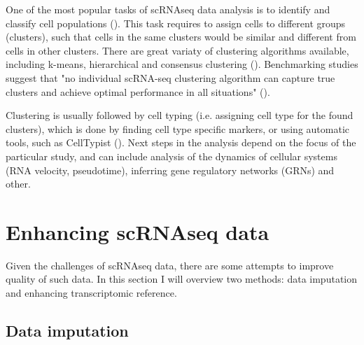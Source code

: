 One of the most popular tasks of scRNAseq data analysis is to identify and classify cell populations (\cite{Andrews2018}).
This task requires to assign cells to different groups (clusters),
such that cells in the same clusters would be similar and different from cells in other clusters.
There are great variaty of clustering algorithms available,
including k-means, hierarchical and consensus clustering (\cite{Peng2020}).
Benchmarking studies suggest that "no individual scRNA-seq clustering algorithm can capture true clusters and achieve
optimal performance in all situations" (\cite{Peng2020}).

Clustering is usually followed by cell typing (i.e. assigning cell type for the found clusters),
which is done by finding cell type specific markers, or using automatic tools, such as CellTypist (\cite{Dom2022}).
Next steps in the analysis depend on the focus of the particular study, and can include
analysis of the dynamics of cellular systems (RNA velocity, pseudotime),
inferring gene regulatory networks (GRNs) and other.

\section{Enhancing scRNAseq data}

Given the challenges of scRNAseq data, there are some attempts to improve quality of such data.
In this section I will overview two methods: data imputation and enhancing transcriptomic reference.

\subsection{Data imputation}

